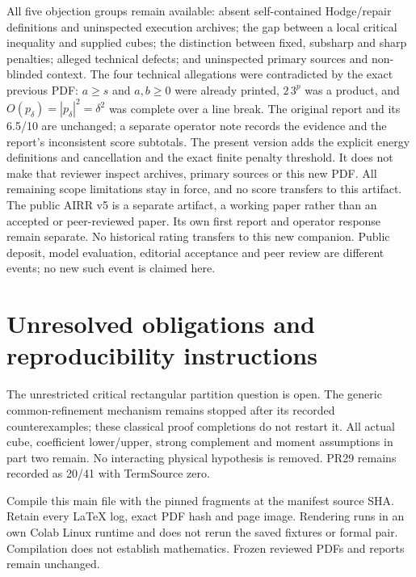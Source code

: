\documentclass[11pt,a4paper]{article}
\begin{document}
All five objection groups remain available: absent self-contained
Hodge/repair definitions and uninspected execution archives; the gap
between a local critical inequality and supplied cubes; the distinction
between fixed, subsharp and sharp penalties; alleged technical defects;
and uninspected primary sources and non-blinded context. The four
technical allegations were contradicted by the exact previous PDF:
$a\geq s$ and $a,b\geq0$ were already printed, $2\,3^p$ was a product,
and $O(p_\delta)=|p_\delta|^2=\delta^2$ was complete over a line break.
The original report and its 6.5/10 are unchanged; a separate operator
note records the evidence and the report's inconsistent score subtotals.
The present version adds the explicit energy definitions and cancellation
and the exact finite penalty threshold. It does not make that reviewer
inspect archives, primary sources or this new PDF. All remaining scope
limitations stay in force, and no score transfers to this artifact.
The public AIRR v5 is a separate artifact, a working paper rather than
an accepted or peer-reviewed paper. Its own first report and operator
response remain separate. No historical rating transfers to this
new companion. Public deposit, model evaluation, editorial acceptance
and peer review are different events; no new such event is claimed here.

\section{Unresolved obligations and reproducibility instructions}
The unrestricted critical rectangular partition question is open. The
generic common-refinement mechanism remains stopped after its recorded
counterexamples; these classical proof completions do not restart it.
All actual cube, coefficient lower/upper, strong complement and moment
assumptions in part two remain. No interacting physical hypothesis is
removed. PR29 remains recorded as 20/41 with TermSource zero.

Compile this main file with the pinned fragments at the manifest source SHA.
Retain every LaTeX log, exact PDF hash and page image. Rendering runs in an
own Colab Linux runtime and does not rerun the saved fixtures or formal pair.
Compilation does not establish mathematics. Frozen reviewed PDFs and reports
remain unchanged.
\end{document}
